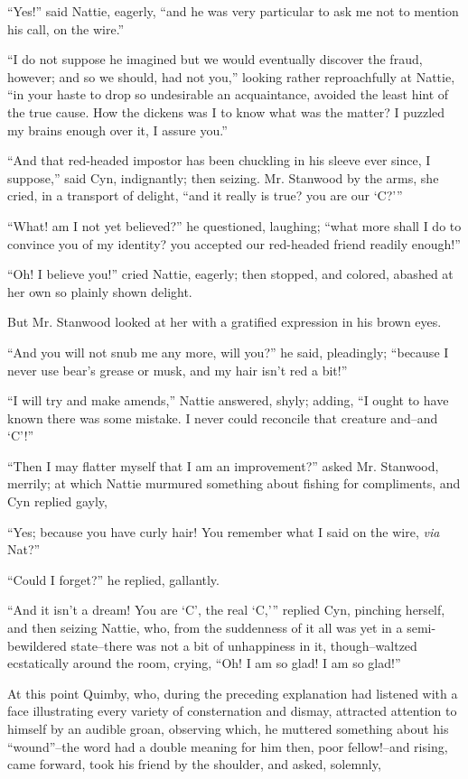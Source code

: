 ``Yes!'' said Nattie, eagerly, ``and he was very particular to ask me not
to mention his call, on the wire.''

``I do not suppose he imagined but we would eventually discover the
fraud, however; and so we should, had not you,'' looking rather
reproachfully at Nattie, ``in your haste to drop so undesirable an
acquaintance, avoided the least hint of the true cause. How the dickens
was I to know what was the matter? I puzzled my brains enough over it, I
assure you.''

``And that red-headed impostor has been chuckling in his sleeve ever
since, I suppose,'' said Cyn, indignantly; then seizing. Mr. Stanwood by
the arms, she cried, in a transport of delight, ``and it really is true?
you are our `C?'{}''

``What! am I not yet believed?'' he questioned, laughing; ``what more shall
I do to convince you of my identity? you accepted our red-headed friend
readily enough!''

``Oh! I believe you!'' cried Nattie, eagerly; then stopped, and colored,
abashed at her own so plainly shown delight.

But Mr. Stanwood looked at her with a gratified expression in his brown
eyes.

``And you will not snub me any more, will you?'' he said, pleadingly;
``because I never use bear's grease or musk, and my hair isn't red a
bit!''

``I will try and make amends,'' Nattie answered, shyly; adding, ``I ought
to have known there was some mistake. I never could reconcile that
creature and--and `C'!''

``Then I may flatter myself that I am an improvement?'' asked Mr.
Stanwood, merrily; at which Nattie murmured something about fishing for
compliments, and Cyn replied gayly,

``Yes; because you have curly hair! You remember what I said on the wire,
\emph{via} Nat?''

``Could I forget?'' he replied, gallantly.

``And it isn't a dream! You are `C', the real `C,'{}'' replied Cyn, pinching
herself, and then seizing Nattie, who, from the suddenness of it all was
yet in a semi-bewildered state--there was not a bit of unhappiness in
it, though--waltzed ecstatically around the room, crying, ``Oh! I am so
glad! I am so glad!''

At this point Quimby, who, during the preceding explanation had listened
with a face illustrating every variety of consternation and dismay,
attracted attention to himself by an audible groan, observing which, he
muttered something about his ``wound''--the word had a double meaning for
him then, poor fellow!--and rising, came forward, took his friend by the
shoulder, and asked, solemnly,

